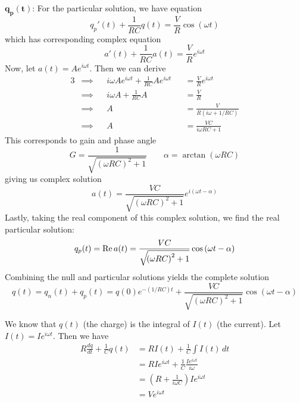 \documentclass[a4paper]{article}
\begin{document}
\(\bm{q_{p} \!\left( t \right) }\): For the particular solution, we have equation
\[
	q_{p}' \!\left( t \right) + \frac{1}{RC} q \!\left( t \right) = \frac{V}{R} \cos\left( \omega t \right)
\]
which has corresponding complex equation
\[
	a'\!\left( t \right) + \frac{1}{RC} a \!\left( t \right) = \frac{V}{R} e^{i \omega t}
\]
Now, let \(a \!\left( t \right) = Ae^{i \omega t}\). Then we can derive
\begin{alignat*}{3}
	&\implies && i \omega A e^{i \omega t} + \frac{1}{RC} Ae^{i \omega t} && = \frac{V}{R} e^{i \omega t} \\
	&\implies && i \omega A + \frac{1}{RC} A && = \frac{V}{R} \\ 
	&\implies && A && = \frac{V}{R \!\left( i \omega + 1/RC \right) } \\
	&\implies && A && = \frac{VC}{i \omega RC + 1}
\end{alignat*}
This corresponds to gain and phase angle
\[
	G = \frac{1}{\sqrt{\!\left( \omega RC \right)^{2} + 1}} \qquad \alpha = \arctan \!\left( \omega RC \right) 
\]
giving us complex solution
\[
	a \!\left( t \right) = \frac{VC}{\sqrt{\!\left( \omega RC \right)^{2} + 1}} e^{i \!\left( \omega t - \alpha  \right) }
\]
Lastly, taking the real component of this complex solution, we find the real particular solution:
\[
	q_{p} \!\left( t \right) = \operatorname{Re} a \!\left( t \right) = \frac{VC}{\sqrt{\!\left( \omega RC \right)^{2} + 1}} \cos\left( \omega t - \alpha  \right)
\]
Combining the null and particular solutions yields the complete solution
\[
	q \!\left( t \right) = q_{n} \!\left( t \right) + q_{p} \!\left( t \right) = q \!\left( 0 \right) e^{-\!\left( 1/RC \right) t} + \frac{VC}{\sqrt{\!\left( \omega RC \right)^{2} + 1}} \cos\left( \omega t - \alpha  \right)
\]


We know that \(q \!\left( t \right) \) (the charge) is the integral of \(I \!\left( t \right) \) (the current). Let \(I \!\left( t \right) = I e^{i \omega t}\). Then we have
\begin{align*}
	R \frac{d q }{d t} + \frac{1}{C} q \!\left( t \right) & = R I \!\left( t \right) + \frac{1}{C} \int I \!\left( t \right) \, dt \\
					& = RIe^{i \omega t} + \frac{1}{C}\frac{Ie^{i \omega t}}{i \omega } \\
					& = \!\left( R + \frac{1}{i \omega C} \right) I e^{i \omega t} \\
					& = V e^{i \omega t}
\end{align*}
\end{document}
